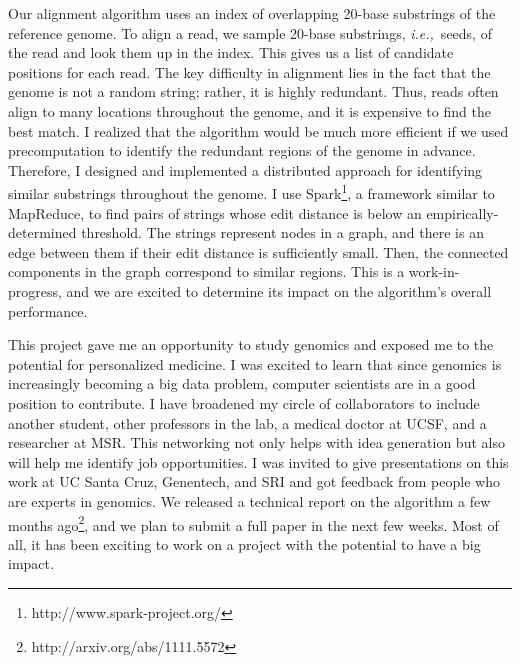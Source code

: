 \documentclass{article}
\newcommand{\ie}{{\em i.e.,}~}
\newcommand{\eg}{{\em e.g.,}~}
\begin{document}
Our alignment algorithm uses an index of overlapping 20-base substrings of the reference genome.
To align a read, we sample 20-base substrings, \ie seeds, of the read and look them up in the index.
This gives us a list of candidate positions for each read.
The key difficulty in alignment lies in the fact that the genome is not a random string; rather, it is highly redundant.
Thus, reads often align to many locations throughout the genome, and it is expensive to find the best match.
I realized that the algorithm would be much more efficient if we used precomputation to identify the redundant regions of the genome in advance.
Therefore, I designed and implemented a distributed approach for identifying similar substrings throughout the genome.
I use Spark\footnote{http://www.spark-project.org/}, a framework similar to MapReduce, to find pairs of strings whose edit distance is below an empirically-determined threshold.
The strings represent nodes in a graph, and there is an edge between them if their edit distance is sufficiently small.
Then, the connected components in the graph correspond to similar regions.
This is a work-in-progress, and we are excited to determine its impact on the algorithm's overall performance.

This project gave me an opportunity to study genomics and exposed me to the potential for personalized medicine.
I was excited to learn that since genomics is increasingly becoming a big data problem, computer scientists are in a good position to contribute.
I have broadened my circle of collaborators to include another student, other professors in the lab, a medical doctor at UCSF, and a researcher at MSR.
This networking not only helps with idea generation but also will help me identify job opportunities.
I was invited to give presentations on this work at UC Santa Cruz, Genentech, and SRI and got feedback from people who are experts in genomics.
We released a technical report on the algorithm a few months ago\footnote{http://arxiv.org/abs/1111.5572}, and we plan to submit a full paper in the next few weeks.
Most of all, it has been exciting to work on a project with the potential to have a big impact.
\end{document}

